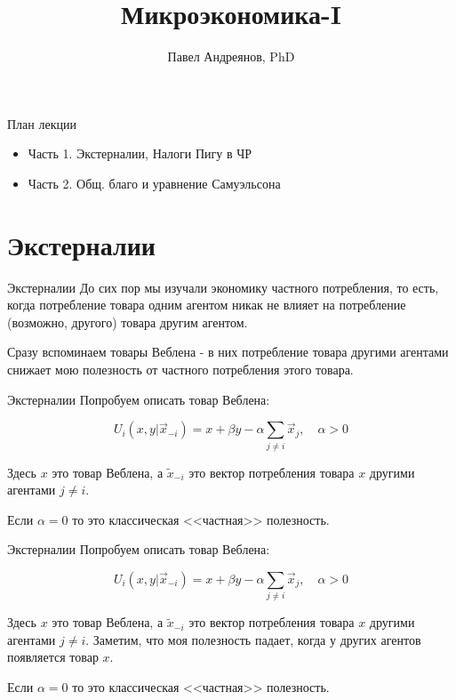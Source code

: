 \documentclass{beamer}
\title{
Микроэкономика-I
}
\author{
Павел Андреянов, PhD
}
\begin{document}
\maketitle

\begin{frame}{План лекции}
\begin{itemize}
  \item Часть 1. Экстерналии, Налоги Пигу в ЧР
  \item Часть 2. Общ. благо и уравнение Самуэльсона
\end{itemize}

\end{frame}

\section{Экстерналии}

\begin{frame}{Экстерналии}
До сих пор мы изучали экономику \alert{частного потребления}, то есть, когда потребление товара одним агентом никак не влияет на потребление (возможно, другого) товара другим агентом.

Сразу вспоминаем \alert{товары Веблена} - в них потребление товара другими агентами снижает мою полезность от частного потребления этого товара. 
\end{frame}

\begin{frame}{Экстерналии}
Попробуем описать товар Веблена:

$$U_i(x, y| \vec x_{-i}) = x + \beta y - \alpha \sum_{j \neq i} \vec x_j, \quad \alpha > 0$$
 
 
Здесь $x$ это товар Веблена, а $\tilde x_{-i}$ это вектор потребления товара $x$ другими агентами $j \neq i$.
 
Если $\alpha = 0$ то это классическая <<частная>> полезность.
\end{frame}

\begin{frame}{Экстерналии}
Попробуем описать товар Веблена:

$$U_i(x, y| \vec x_{-i}) = x + \beta y - \alpha \sum_{j \neq i} \vec x_j, \quad \alpha > 0$$
 
 
Здесь $x$ это товар Веблена, а $\tilde x_{-i}$ это вектор потребления товара $x$ другими агентами $j \neq i$. Заметим, что моя полезность падает, когда у других агентов появляется товар $x$.
 
Если $\alpha = 0$ то это классическая <<частная>> полезность.
\end{frame}
\end{document}
